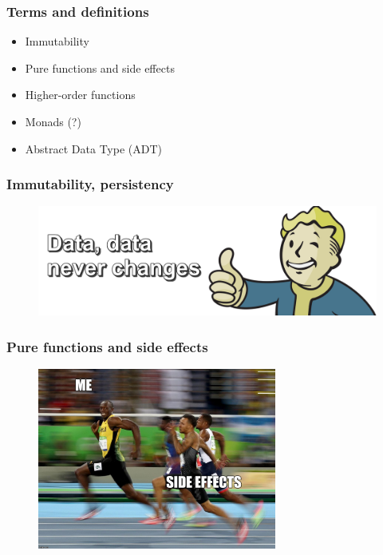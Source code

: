 \documentclass[18pt, compress, aspectratio=169]{beamer}
\begin{document}
\begin{frame}[fragile]
    \frametitle{Terms and definitions}
    \begin{itemize}[label={\MVRightarrow}]
        \item Immutability
        \item Pure functions and side effects
        \item Higher-order functions
        \item Monads (?)
        \item Abstract Data Type (ADT)
    \end{itemize}
\end{frame}

\begin{frame}
    \frametitle{Immutability, persistency}
    \vspace{-20pt}
    \begin{figure}
        \includegraphics[width=1.0\textwidth,center]{Vault_Boy_text.png}
    \end{figure}
\end{frame}

\begin{frame}
    \frametitle{Pure functions and side effects}
    \vspace{-25pt}
    \begin{figure}
        \includegraphics[width=0.7\textwidth,center]{side_effect.jpg}
    \end{figure}
\end{frame}
\end{document}
